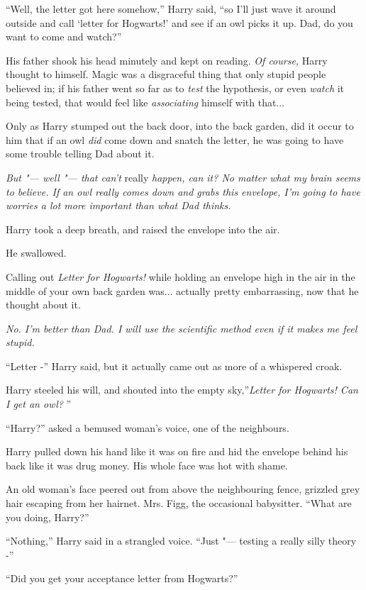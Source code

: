 ``Well, the letter got here somehow,'' Harry said, ``so I'll just wave
it around outside and call `letter for Hogwarts!' and see if an owl
picks it up. Dad, do you want to come and watch?''

His father shook his head minutely and kept on reading. \emph{Of
course,} Harry thought to himself. Magic was a disgraceful thing that
only stupid people believed in; if his father went so far as to
\emph{test} the hypothesis, or even \emph{watch} it being tested, that
would feel like \emph{associating} himself with that...

Only as Harry stumped out the back door, into the back garden, did it
occur to him that if an owl \emph{did} come down and snatch the letter,
he was going to have some trouble telling Dad about it.

\emph{But "--- well "--- that can't} really \emph{happen, can it? No matter
what my brain seems to believe. If an owl really comes down and grabs
this envelope, I'm going to have worries a lot more important than what
Dad thinks.}

Harry took a deep breath, and raised the envelope into the air.

He swallowed.

Calling out \emph{Letter for Hogwarts!} while holding an envelope high
in the air in the middle of your own back garden was... actually
pretty embarrassing, now that he thought about it.

\emph{No. I'm better than Dad. I will use the scientific method even if
it makes me feel stupid.}

``Letter -'' Harry said, but it actually came out as more of a whispered
croak.

Harry steeled his will, and shouted into the empty sky,''\emph{Letter
for Hogwarts! Can I get an owl?} ''

``Harry?'' asked a bemused woman's voice, one of the neighbours.

Harry pulled down his hand like it was on fire and hid the envelope
behind his back like it was drug money. His whole face was hot with
shame.

An old woman's face peered out from above the neighbouring fence,
grizzled grey hair escaping from her hairnet. Mrs. Figg, the occasional
babysitter. ``What are you doing, Harry?''

``Nothing,'' Harry said in a strangled voice. ``Just "--- testing a really
silly theory -''

``Did you get your acceptance letter from Hogwarts?''


